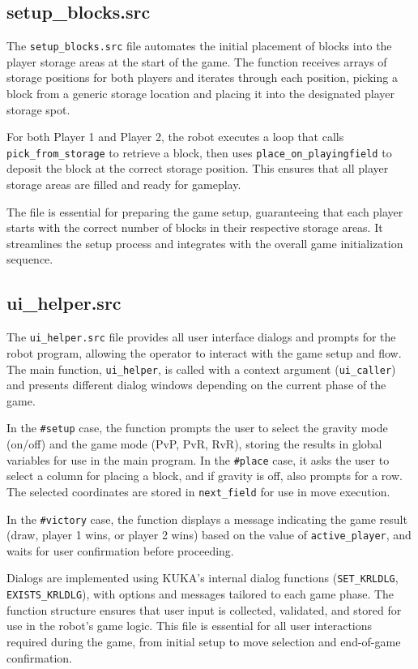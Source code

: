 \documentclass{article}
\begin{document}
        \subsection{setup\_blocks.src}
            The \texttt{setup\_blocks.src} file automates the initial placement of blocks into the player storage areas at the start of the game. The function receives arrays of storage positions for both players and iterates through each position, picking a block from a generic storage location and placing it into the designated player storage spot.

            For both Player 1 and Player 2, the robot executes a loop that calls \texttt{pick\_from\_storage} to retrieve a block, then uses \texttt{place\_on\_playingfield} to deposit the block at the correct storage position. This ensures that all player storage areas are filled and ready for gameplay.

            The file is essential for preparing the game setup, guaranteeing that each player starts with the correct number of blocks in their respective storage areas. It streamlines the setup process and integrates with the overall game initialization sequence.

        \subsection{ui\_helper.src}
            The \texttt{ui\_helper.src} file provides all user interface dialogs and prompts for the robot program, allowing the operator to interact with the game setup and flow. The main function, \texttt{ui\_helper}, is called with a context argument (\texttt{ui\_caller}) and presents different dialog windows depending on the current phase of the game.

            In the \texttt{\#setup} case, the function prompts the user to select the gravity mode (on/off) and the game mode (PvP, PvR, RvR), storing the results in global variables for use in the main program. In the \texttt{\#place} case, it asks the user to select a column for placing a block, and if gravity is off, also prompts for a row. The selected coordinates are stored in \texttt{next\_field} for use in move execution.

            In the \texttt{\#victory} case, the function displays a message indicating the game result (draw, player 1 wins, or player 2 wins) based on the value of \texttt{active\_player}, and waits for user confirmation before proceeding.

            Dialogs are implemented using KUKA's internal dialog functions (\texttt{SET\_KRLDLG}, \texttt{EXISTS\_KRLDLG}), with options and messages tailored to each game phase. The function structure ensures that user input is collected, validated, and stored for use in the robot's game logic. This file is essential for all user interactions required during the game, from initial setup to move selection and end-of-game confirmation.
\end{document}
